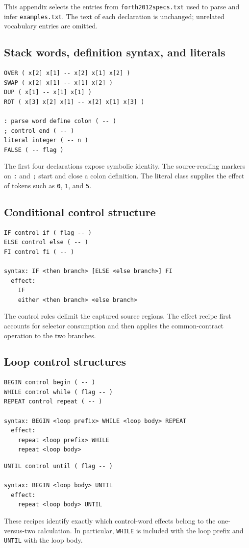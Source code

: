 \documentclass[11pt,a4paper]{article}
\begin{document}
This appendix selects the entries from \texttt{forth2012specs.txt} used to
parse and infer \texttt{examples.txt}.  The text of each declaration is
unchanged; unrelated vocabulary entries are omitted.

\subsection{Stack words, definition syntax, and literals}
\begin{verbatim}
OVER ( x[2] x[1] -- x[2] x[1] x[2] )
SWAP ( x[2] x[1] -- x[1] x[2] )
DUP ( x[1] -- x[1] x[1] )
ROT ( x[3] x[2] x[1] -- x[2] x[1] x[3] )

: parse word define colon ( -- )
; control end ( -- )
literal integer ( -- n )
FALSE ( -- flag )
\end{verbatim}
The first four declarations expose symbolic identity.  The source-reading
markers on \texttt{:} and \texttt{;} start and close a colon definition.  The
literal class supplies the effect of tokens such as \texttt{0}, \texttt{1},
and \texttt{5}.

\subsection{Conditional control structure}
\begin{verbatim}
IF control if ( flag -- )
ELSE control else ( -- )
FI control fi ( -- )

syntax: IF <then branch> [ELSE <else branch>] FI
  effect:
    IF
    either <then branch> <else branch>
\end{verbatim}
The control roles delimit the captured source regions.  The effect recipe first
accounts for selector consumption and then applies the common-contract
operation to the two branches.

\subsection{Loop control structures}
\begin{verbatim}
BEGIN control begin ( -- )
WHILE control while ( flag -- )
REPEAT control repeat ( -- )

syntax: BEGIN <loop prefix> WHILE <loop body> REPEAT
  effect:
    repeat <loop prefix> WHILE
    repeat <loop body>
\end{verbatim}
\begin{samepage}
\begin{verbatim}
UNTIL control until ( flag -- )

syntax: BEGIN <loop body> UNTIL
  effect:
    repeat <loop body> UNTIL
\end{verbatim}
\end{samepage}
These recipes identify exactly which control-word effects belong to the
one-versus-two calculation.  In particular, \texttt{WHILE} is included with
the loop prefix and \texttt{UNTIL} with the loop body.
\end{document}
